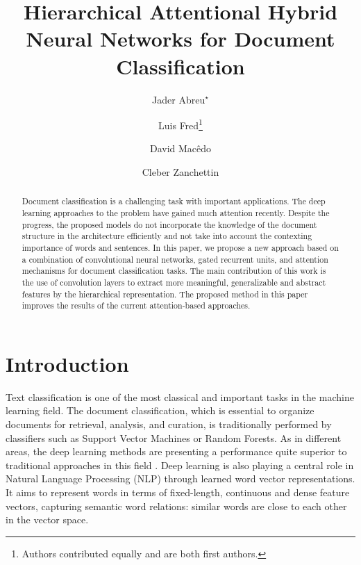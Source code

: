 \documentclass[runningheads]{llncs}
\begin{document}
\title{Hierarchical Attentional Hybrid Neural Networks for Document Classification}

\author{Jader Abreu$^{\star}$ \and
 Luis Fred\thanks{Authors contributed equally and are both first authors.} \and
David Mac\^{e}do \and
Cleber Zanchettin
}





\maketitle  

\begin{abstract}

Document classification is a challenging task with important applications. The deep learning approaches to the problem have gained much attention recently. Despite the progress, the proposed models do not incorporate the knowledge of the document structure in the architecture efficiently and not take into account the contexting importance of words and sentences. In this paper, we propose a new approach based on a combination of convolutional neural networks, gated recurrent units, and attention mechanisms for document classification tasks. The main contribution of this work is the use of convolution layers to extract more meaningful, generalizable and abstract features by the hierarchical representation. The proposed method in this paper improves the results of the current attention-based approaches.


\end{abstract}





\section{Introduction} 
\vspace{-2mm}
Text classification is one of the most classical and important tasks in the machine learning field. The document classification, which is essential to organize documents for retrieval, analysis, and curation, is traditionally performed by classifiers such as Support Vector Machines or Random Forests. As in different areas, the deep learning methods are presenting a performance quite superior to traditional approaches in this field \cite{c13}. Deep learning is also playing a central role in Natural Language Processing (NLP) through learned word vector representations. It aims to represent words in terms of fixed-length, continuous and dense feature vectors, capturing semantic word relations: similar words are close to each other in the vector space. 
\end{document}
